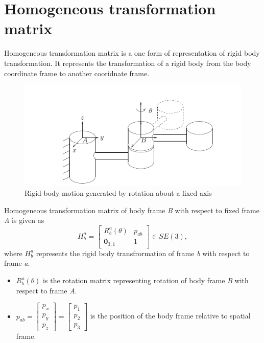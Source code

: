 \section{ Homogeneous transformation matrix}
\label{sec:htm}
Homogeneous transformation matrix is a one form of representation of rigid body transformation. It represents the transformation of a rigid body from the body coordinate frame to another cooridnate frame. 
\begin{figure}
    \centering
    \includegraphics{Bilder/htm_example.png}
    \caption[Rigid body motion generated by rotation about a fixed axis]{Rigid body motion generated by rotation about a fixed axis \footnotemark[1]}
    \label{fig:htm}
\end{figure}
Homogeneous transformation matrix of body frame \emph{B} with respect to fixed frame \emph{A} is given as
\begin{equation}
    H_b^a = \begin{bmatrix} R_b^a(\theta) & p_{ab} \\ \textbf{0}_{3,1} &1 \end{bmatrix} \in SE(3),
\end{equation}
where $H_b^a$ represents the rigid body transfrormation of frame \emph{b} with respect to frame \emph{a}.
\begin{itemize}
    \item $R_b^a(\theta)$ is the rotation matrix representing rotation of body frame \emph{B} with respect to frame \emph{A}. 
    \item $p_{ab} = \begin{bmatrix} p_x \\ p_y \\ p_z \end{bmatrix} = \begin{bmatrix} p_1 \\ p_2 \\ p_3 \end{bmatrix} $ is the position of the body frame relative to spatial frame. 
\end{itemize}
